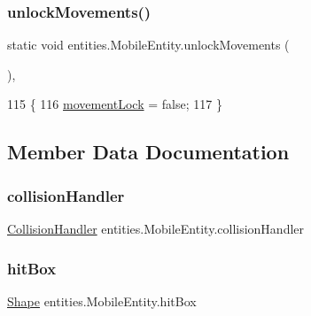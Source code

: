 \subsubsection{\texorpdfstring{unlock\+Movements()}{unlockMovements()}}
{\footnotesize\ttfamily static void entities.\+Mobile\+Entity.\+unlock\+Movements (\begin{DoxyParamCaption}{ }\end{DoxyParamCaption})\hspace{0.3cm}{\ttfamily [inline]}, {\ttfamily [static]}}


\begin{DoxyCode}
115                                          \{
116         \mbox{\hyperlink{classentities_1_1_mobile_entity_a11e74ffe949d0d32ab26bcf36fa2bb1d}{movementLock}} = \textcolor{keyword}{false};
117     \}
\end{DoxyCode}


\subsection{Member Data Documentation}
\mbox{\label{classentities_1_1_mobile_entity_a29fbe797671b1fc81eafe1e48fdc46f9}} 
\subsubsection{\texorpdfstring{collision\+Handler}{collisionHandler}}
{\footnotesize\ttfamily \mbox{\hyperlink{classentities_1_1_collision_handler}{Collision\+Handler}} entities.\+Mobile\+Entity.\+collision\+Handler\hspace{0.3cm}{\ttfamily [package]}}

\mbox{\label{classentities_1_1_mobile_entity_a996d583dcbf4fd5609e14ec87dbfa7a6}} 
\subsubsection{\texorpdfstring{hit\+Box}{hitBox}}
{\footnotesize\ttfamily \mbox{\hyperlink{classorg_1_1newdawn_1_1slick_1_1geom_1_1_shape}{Shape}} entities.\+Mobile\+Entity.\+hit\+Box\hspace{0.3cm}{\ttfamily [private]}}

